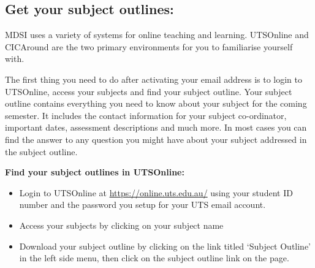 \documentclass[]{book}
\providecommand{\tightlist}{%
  \setlength{\itemsep}{0pt}\setlength{\parskip}{0pt}}
\theoremstyle{definition}
\theoremstyle{definition}
\theoremstyle{remark}
\begin{document}
\subsection{Get your subject outlines:}\label{get-your-subject-outlines}

MDSI uses a variety of systems for online teaching and learning.
UTSOnline and CICAround are the two primary environments for you to
familiarise yourself with.

The first thing you need to do after activating your email address is to
login to UTSOnline, access your subjects and find your subject outline.
Your subject outline contains everything you need to know about your
subject for the coming semester. It includes the contact information for
your subject co-ordinator, important dates, assessment descriptions and
much more. In most cases you can find the answer to any question you
might have about your subject addressed in the subject outline.

\textbf{Find your subject outlines in UTSOnline:}

\begin{itemize}
\tightlist
\item
  Login to UTSOnline at \url{https://online.uts.edu.au/} using your
  student ID number and the password you setup for your UTS email
  account.
\item
  Access your subjects by clicking on your subject name
\item
  Download your subject outline by clicking on the link titled `Subject
  Outline' in the left side menu, then click on the subject outline link
  on the page.
\end{itemize}


\end{document}
